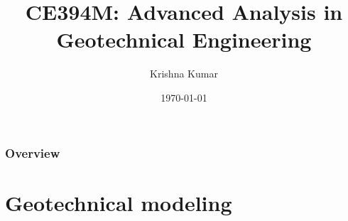 \documentclass[handout]{beamer}
\title[CE394M: Geotechnical modeling]{CE394M: Advanced Analysis in Geotechnical Engineering}
\author{Krishna Kumar} %
\institute[UT Austin] %
{
University of Texas at Austin \\
\medskip
\textit{
  \url{krishnak@utexas.edu}} %
}
\date{\today} %
\begin{document}
\begin{frame}
\titlepage %
\end{frame}

\begin{frame}
 \frametitle{Overview}
 \tableofcontents
\end{frame}


\section{Geotechnical modeling}
\end{document}
